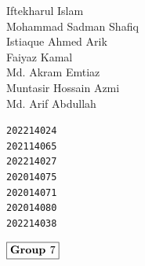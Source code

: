 \documentclass[12pt]{article}
\begin{document}
\begin{center}
    \begin{minipage}{0.5\textwidth}
        \begin{flushleft}
            \large Iftekharul Islam\\
            \large Mohammad Sadman Shafiq\\
            \large Istiaque Ahmed Arik\\
            \large Faiyaz Kamal\\
            \large Md. Akram Emtiaz\\
            \large Muntasir Hossain Azmi\\
            \large Md. Arif Abdullah\\
        \end{flushleft}
    \end{minipage}%
    \begin{minipage}{0.5\textwidth}
        \begin{flushright}
            {\texttt{\large 202214024\\}}
            {\texttt{\large 202114065\\}}
            {\texttt{\large 202214027\\}}
            {\texttt{\large 202014075\\}}
            {\texttt{\large 202014071\\}}
            {\texttt{\large 202014080\\}}
            {\texttt{\large 202214038\\}}
    
        \end{flushright}
    \end{minipage}
\end{center}
\begin{flushleft}
    \large $\boxed{\text{\bf Group } 7}$\\[4.0cm]
\end{flushleft}
    

\thispagestyle{empty}


\end{document}
